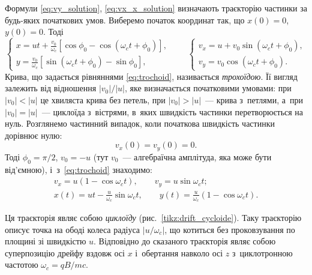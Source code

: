 Формули \eqref{eq:vy_solution}, \eqref{eq:vx_x_solution} визначають траєкторію частинки за будь-яких початкових умов. Виберемо початок координат так, що $x(0) = 0$, $y(0) = 0$. Тоді
\begin{equation}\label{eq:trochoid}
	\begin{cases}
		x = ut + \frac{v_0}{\omega_c}[\cos\phi_0 - \cos(\omega_c t + \phi_0)], \\
		y = \frac{v_0}{\omega_c}[\sin(\omega_c t + \phi_0) - \sin\phi_0],
	\end{cases}
	\qquad
	\begin{cases}
		v_x = u + v_0 \sin(\omega_c t + \phi_0), \\
		v_y = v_0 \cos(\omega_c t + \phi_0).
	\end{cases}
\end{equation}
Крива, що задається рівняннями \eqref{eq:trochoid}, називається \emph{трохоїдою}. Її вигляд залежить від відношення $|v_0|/|u|$, яке визначається початковими умовами: при $|v_0| < |u|$ це хвиляста крива без петель, при $|v_0| > |u|$~--- крива з~петлями, а~при $|v_0| = |u|$~--- циклоїда з~вістрями, в~яких швидкість частинки перетворюється на нуль. Розглянемо частинний випадок, коли початкова швидкість частинки дорівнює нулю:
\begin{equation}\label{eq:zero_initial_velocity}
	v_x(0) = v_y(0) = 0.
\end{equation}
Тоді $\phi_0 = \pi/2$, $v_0 = -u$ (тут $v_0$~--- алгебраїчна амплітуда, яка може бути від'ємною), і~з~\eqref{eq:trochoid} знаходимо:
\begin{equation}\label{eq:cycloid}
	\begin{gathered}
		v_x = u(1 - \cos\omega_c t), \qquad v_y = u \sin\omega_c t; \\
		x(t) = ut - \frac{u}{\omega_c}\sin\omega_c t, \qquad
		y(t) = \frac{u}{\omega_c}(1 - \cos\omega_c t).
	\end{gathered}
\end{equation}

Ця траєкторія являє собою \emph{циклоїду} (рис.~\ref{tikz:drift_cycloide}). Таку траєкторію описує точка на ободі колеса радіуса $|u/\omega_c|$, що котиться без проковзування по площині зі швидкістю $u$. Відповідно до сказаного траєкторія являє собою суперпозицію дрейфу вздовж осі $x$ і~обертання навколо осі $z$ з~циклотронною частотою $\omega_c = qB/mc$.

